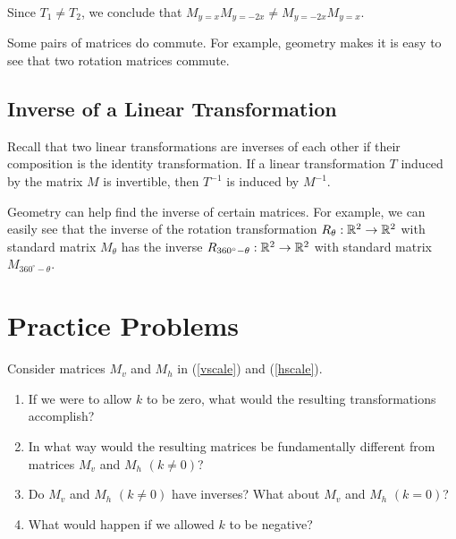 \documentclass{ximera}
\begin{document}
\begin{exploration}
\begin{center}
\end{center}

Since $T_1\neq T_2$, we conclude that $M_{y=x}M_{y=-2x}\neq M_{y=-2x}M_{y=x}$.

\end{exploration}

\begin{example}\label{ex:rotationscommute}
Some pairs of matrices do commute.  For example, geometry makes it is easy to see that two rotation matrices commute.
\end{example}




 
\subsection*{Inverse of a Linear Transformation}
Recall that two linear transformations are inverses of each other if their composition is the identity transformation.
If a linear transformation $T$ induced by the matrix $M$ is invertible, then $T^{-1}$ is induced by $M^{-1}$.  

Geometry can help find the inverse of certain matrices.  For example, we can easily see that the inverse of the rotation transformation $R_{\theta}:\mathbb{R}^2\rightarrow \mathbb{R}^2$ with standard matrix $M_{\theta}$ has the inverse $R_{360^{\circ}-\theta}:\mathbb{R}^2\rightarrow \mathbb{R}^2$ with standard matrix $M_{360^{\circ}-\theta}$.

\section*{Practice Problems}
\begin{problem}\label{prob:k0}
Consider matrices $M_v$ and $M_h$ in (\ref{vscale}) and (\ref{hscale}).  
\begin{enumerate}
\item
If we were to allow $k$ to be zero, what would the resulting transformations accomplish?  
\item In what way would the resulting matrices be fundamentally different from matrices $M_v$ and $M_h$ $(k\neq 0)$?  
\item Do $M_v$ and $M_h$ $(k\neq 0)$ have inverses?  What about $M_v$ and $M_h$ $(k= 0)$?  
\item What would happen if we allowed $k$ to be negative?
\end{enumerate}
\end{problem}
\end{document}
